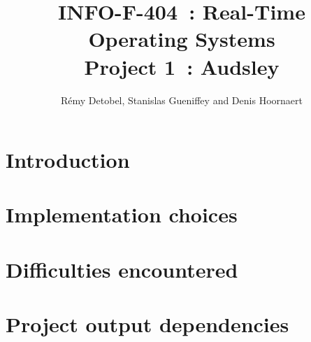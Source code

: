 \documentclass[a4paper,11pt]{article}
\title{INFO-F-404~: Real-Time Operating Systems\\Project 1~: Audsley}
\author{Rémy Detobel, Stanislas Gueniffey and Denis Hoornaert}
\begin{document}
\maketitle
\tableofcontents

\begin{abstract}
\end{abstract}

\section{Introduction}

\section{Implementation choices}

\section{Difficulties encountered}

\section{Project output dependencies}
\end{document}
